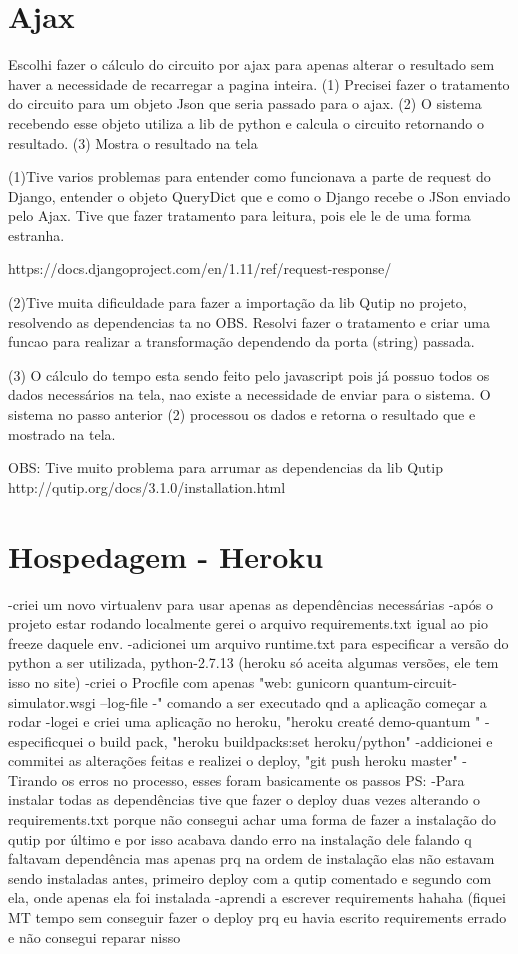 \documentclass[a4paper, 12pt, oneside]{book}
\begin{document}
\section{Ajax}

Escolhi fazer o cálculo do circuito por ajax para apenas alterar o resultado sem haver a necessidade de recarregar a pagina inteira. (1) Precisei fazer o tratamento do circuito para um objeto Json que seria passado para o ajax. (2) O sistema recebendo esse objeto utiliza a lib de python e calcula o circuito retornando o resultado. (3) Mostra o resultado na tela

(1)Tive varios problemas para entender como funcionava a parte de request do Django, entender o objeto QueryDict que e como o Django recebe o JSon enviado pelo Ajax. Tive que fazer tratamento para leitura, pois ele le de uma forma estranha.

https://docs.djangoproject.com/en/1.11/ref/request-response/

(2)Tive muita dificuldade para fazer a importação da lib Qutip no projeto, resolvendo as dependencias ta no OBS. Resolvi fazer o tratamento e criar uma funcao para realizar a transformação dependendo da porta (string) passada.

(3) O cálculo do tempo esta sendo feito pelo javascript pois já possuo todos os dados necessários na tela, nao existe a necessidade de enviar para o sistema. O sistema no passo anterior (2) processou os dados e retorna o resultado que e mostrado na tela.

OBS: Tive muito problema para arrumar as dependencias da lib Qutip
http://qutip.org/docs/3.1.0/installation.html

\section{Hospedagem - Heroku}

-criei um novo virtualenv para usar apenas as dependências necessárias
-após o projeto estar rodando localmente gerei o arquivo requirements.txt igual ao pio freeze daquele env.
-adicionei um arquivo runtime.txt para especificar a versão do python a ser utilizada, python-2.7.13 (heroku só aceita algumas versões, ele tem isso no site)
-criei o Procfile com apenas "web: gunicorn quantum-circuit-simulator.wsgi --log-file -" comando a ser executado qnd a aplicação começar a rodar
-logei e criei uma aplicação no heroku, "heroku creaté demo-quantum "
-especificquei o build pack, "heroku buildpacks:set heroku/python"
-addicionei e commitei as alterações feitas e realizei o deploy, "git push heroku master"
-Tirando os erros no processo, esses foram basicamente os passos
PS:
-Para instalar todas as dependências tive que fazer o deploy duas vezes alterando o requirements.txt porque não consegui achar uma forma de fazer a instalação do qutip por último e por isso acabava dando erro na instalação dele falando q faltavam dependência mas apenas prq na ordem de instalação elas não estavam sendo instaladas antes, primeiro deploy com a qutip comentado e segundo com ela, onde apenas ela foi instalada
-aprendi a escrever requirements hahaha (fiquei MT tempo sem conseguir fazer o deploy prq eu havia escrito requirements errado e não consegui reparar nisso
\end{document}

